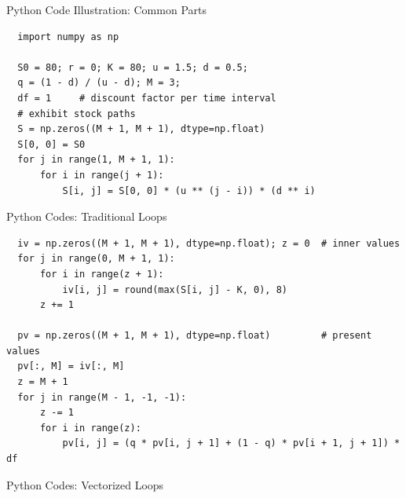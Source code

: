 \documentclass[10pt,handout]{beamer}
\theoremstyle{definition}
\newtheorem*{ex}{Example}
\newtheorem*{sol}{Solution}
\begin{document}
\begin{frame}[fragile]{Python Code Illustration: Common Parts}
  \begin{verbatim}
  import numpy as np
  
  S0 = 80; r = 0; K = 80; u = 1.5; d = 0.5; 
  q = (1 - d) / (u - d); M = 3; 
  df = 1     # discount factor per time interval
  # exhibit stock paths
  S = np.zeros((M + 1, M + 1), dtype=np.float)  
  S[0, 0] = S0
  for j in range(1, M + 1, 1):
      for i in range(j + 1):
          S[i, j] = S[0, 0] * (u ** (j - i)) * (d ** i)
  \end{verbatim}
\end{frame}
  
\begin{frame}[fragile]{Python Codes: Traditional Loops}
  \begin{verbatim}
  iv = np.zeros((M + 1, M + 1), dtype=np.float); z = 0  # inner values
  for j in range(0, M + 1, 1):
      for i in range(z + 1):
          iv[i, j] = round(max(S[i, j] - K, 0), 8)
      z += 1
  
  pv = np.zeros((M + 1, M + 1), dtype=np.float)         # present values
  pv[:, M] = iv[:, M]
  z = M + 1
  for j in range(M - 1, -1, -1):
      z -= 1
      for i in range(z):
          pv[i, j] = (q * pv[i, j + 1] + (1 - q) * pv[i + 1, j + 1]) * df
  \end{verbatim}
\end{frame}

\begin{frame}{Python Codes: Vectorized Loops}
  \inputminted[fontsize=\footnotesize,linenos=true]{python}{fig/note08/binomial_vec.py}
\end{frame}

\end{document}
